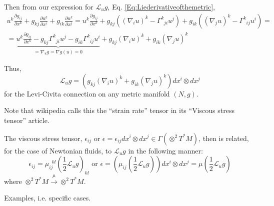 \documentclass[twoside,landscape,10pt]{amsart}
\theoremstyle{plain}
\theoremstyle{definition}
\theoremstyle{remark}
\theoremstyle{remark}
\begin{document}
\begin{multicols*}{2}
Then from our expression for $\mathcal{L}_ug$, Eq. \ref{Eq:Liederivativeofthemetric}, 
\[
\begin{gathered}
  u^k \frac{ \partial g_{ij}}{ \partial x^k} + g_{kj} \frac{ \partial u^k}{ \partial x^i} + g_{ik} \frac{ \partial u^k }{ \partial x^j}   = u^k \frac{ \partial g_{ij}}{ \partial x^k} + g_{kj} ((\nabla_iu)^k - \Gamma^k_{ \; \; ji} u^j ) + g_{ik} ((\nabla_j u)^k - \Gamma^k_{ \; \; ij} u^i ) = \\
  = \underbrace{ u^k \frac{ \partial g_{ij} }{ \partial x^k} - g_{kj} \Gamma^k_{ \; \; ji} u^j - g_{ik} \Gamma^k_{ \; \; ij} u^i }_{ = \nabla_u g = \nabla g(u) = 0 } + g_{kj} (\nabla_i u)^k + g_{ik} (\nabla_j u)^k 
\end{gathered}
\]

Thus,
\begin{equation}\label{Eq:Liederivativeofmetricresult}
  \boxed{ \mathcal{L}_u g = (g_{kj} (\nabla_i u)^k + g_{ik} (\nabla_j u)^k ) dx^i \otimes dx^j }
\end{equation}
for the Levi-Civita connection on any metric manifold $(N,g)$.  

Note that wikipedia calls this the ``strain rate'' tensor in its ``Viscous stress tensor'' article.  

The viscous stress tensor, $\epsilon_{ij}$ or $\epsilon = \epsilon_{ij} dx^i \otimes dx^j \in \Gamma( \otimes^2 T^*M)$, then is related, for the case of Newtonian fluids, to $\mathcal{L}_ug$ in the following manner:
\[
\epsilon_{ij} = \mu_{ij}^{ \; \; kl} (\frac{1}{2} \mathcal{L}_ug)_{kl} \text{ or } \epsilon = (\mu_{ij}(\frac{1}{2} \mathcal{L}_ug) ) dx^i \otimes dx^j = \mu(\frac{1}{2} \mathcal{L}_u g)
\]
where $\otimes^2 T^*M \xrightarrow{ \mu } \otimes^2 T^*M$.  

Examples, i.e. specific cases.  


\end{multicols*}
\end{document}
